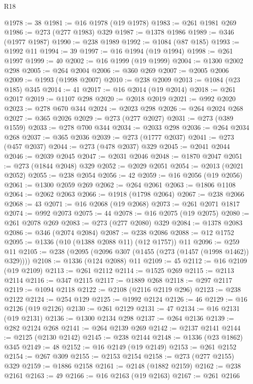 \begin{lexlean}{R18}
\begin{coremodule}
{{{{{{{{{{{{{{{{{{{{{{{{{{{{{{{{{{{{{{{{{{{{{{{{{{{{{{{{{{{{{{{{{{{{{{{{{{{{{{{{{{{{{{{{{{{{{{{{{{{{{{{{{{{{{{{{{{{{{{{{{{{{{{{{{{{{{{{{{{{{{{{@1978 := 38
@1981 := @16 @1978 (@19 @1978)
@1983 := @261 @1981 @269
@1986 := @273 (@277 @1983) @329
@1987 := @1378 @1986
@1989 := @346 (@1977 @1987)
@1990 := @238 @1989
@1992 := @1084 (@87 @185)
@1993 := @1992 @11
@1994 := 39
@1997 := @16 @1994 (@19 @1994)
@1998 := @261 @1997
@1999 := 40
@2002 := @16 @1999 (@19 @1999)
@2004 := @1300 @2002 @298
@2005 := @264 @2004
@2006 := @360 @269
@2007 := @2005 @2006
@2009 := @1993 (@1998 @2007)
@2010 := @238 @2009
@2013 := @1084 (@23 @185) @345
@2014 := 41
@2017 := @16 @2014 (@19 @2014)
@2018 := @261 @2017
@2019 := @1107 @298
@2020 := @2018 @2019
@2021 := @992 @2020
@2023 := @278 @670 @344
@2024 := @2023 @298
@2026 := @264 @2024 @268
@2027 := @365 @2026
@2029 := @273 (@277 @2027)
@2031 := @273 (@389 @1559)
@2033 := @278 @700 @344
@2034 := @2033 @298
@2036 := @264 @2034 @268
@2037 := @365 @2036
@2039 := @273 (@1777 @2037)
@2041 := @273 (@457 @2037)
@2044 := @273 (@478 @2037) @329
@2045 := @2041 @2044
@2046 := @2039 @2045
@2047 := @2031 @2046
@2048 := @1870 @2047
@2051 := @273 (@1844 @2048) @329
@2052 := @2029 @2051
@2054 := @2013 (@2021 @2052)
@2055 := @238 @2054
@2056 := 42
@2059 := @16 @2056 (@19 @2056)
@2061 := @1300 @2059 @269
@2062 := @264 @2061
@2063 := @1806 @1108
@2064 := @2062 @2063
@2066 := @1918 (@1798 @2064)
@2067 := @238 @2066
@2068 := 43
@2071 := @16 @2068 (@19 @2068)
@2073 := @261 @2071 @1817
@2074 := @992 @2073
@2075 := 44
@2078 := @16 @2075 (@19 @2075)
@2080 := @261 @2078 @269
@2083 := @273 (@277 @2080) @329
@2084 := @1378 @2083
@2086 := @346 (@2074 @2084)
@2087 := @238 @2086
@2088 := @12 @1752
@2095 := @1336 (@10 (@1388 @2088 @11) (@12 @1757)) @11
@2096 := @259 @11
@2105 := @238 (@2095 (@2096 @307 (@1455 (@273 (@1457 (@1998 @1462)) @329))))
@2108 := @1336 (@124 @2088) @11
@2109 := 45
@2112 := @16 @2109 (@19 @2109)
@2113 := @261 @2112
@2114 := @1525 @269
@2115 := @2113 @2114
@2116 := @347 @2115
@2117 := @1889 @268
@2118 := @297 @2117
@2119 := @1094 @2118
@2122 := @2108 (@2116 @2119 @296)
@2123 := @238 @2122
@2124 := @254 @129
@2125 := @1992 @2124
@2126 := 46
@2129 := @16 @2126 (@19 @2126)
@2130 := @261 @2129
@2131 := 47
@2134 := @16 @2131 (@19 @2131)
@2136 := @1300 @2134 @298
@2137 := @264 @2136
@2139 := @282 @2124 @268
@2141 := @264 @2139 @269
@2142 := @2137 @2141
@2144 := @2125 (@2130 @2142)
@2145 := @238 @2144
@2148 := @1336 (@23 @1862) @345
@2149 := 48
@2152 := @16 @2149 (@19 @2149)
@2153 := @261 @2152
@2154 := @267 @309
@2155 := @2153 @2154
@2158 := @273 (@277 @2155) @329
@2159 := @1886 @2158
@2161 := @2148 (@1882 @2159)
@2162 := @238 @2161
@2163 := 49
@2166 := @16 @2163 (@19 @2163)
@2167 := @261 @2166
}}}}}}}}}}}}}}}}}}}}}}}}}}}}}}}}}}}}}}}}}}}}}}}}}}}}}}}}}}}}}}}}}}}}}}}}}}}}}}}}}}}}}}}}}}}}}}}}}}}}}}}}}}}}}}}}}}}}}}}}}}}}}}}}}}}}}}}}}}}}}}}
\end{coremodule}
\end{lexlean}

